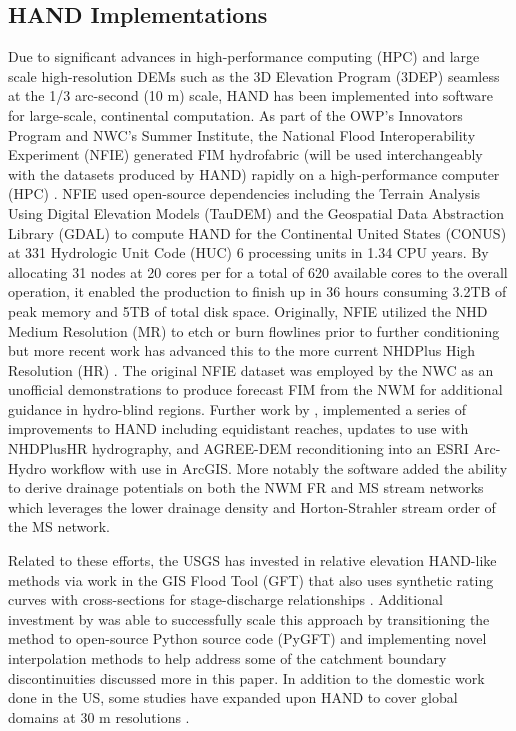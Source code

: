 \documentclass[draft]{dependencies/agujournal2019}
\begin{document}
\subsection{HAND Implementations}
%
Due to significant advances in high-performance computing (HPC) and large scale high-resolution DEMs such as the 3D Elevation Program (3DEP) seamless at the 1/3 arc-second (10 m) scale, HAND has been implemented into software for large-scale, continental computation. 
As part of the OWP's Innovators Program and NWC's Summer Institute, the National Flood Interoperability Experiment (NFIE) generated FIM hydrofabric (will be used interchangeably with the datasets produced by HAND) rapidly on a high-performance computer (HPC) \cite{maidment2017conceptual,liu2016cybergis}. 
NFIE used open-source dependencies including the Terrain Analysis Using Digital Elevation Models (TauDEM) \cite{tarboton2005terrain} and the Geospatial Data Abstraction Library (GDAL) \cite{warmerdam2008geospatial} to compute HAND for the Continental United States (CONUS) at 331 Hydrologic Unit Code (HUC) 6 processing units in 1.34 CPU years.
By allocating 31 nodes at 20 cores per for a total of 620 available cores to the overall operation, it enabled the production to finish up in 36 hours consuming 3.2TB of peak memory and 5TB of total disk space.
Originally, NFIE utilized the NHD Medium Resolution (MR) to etch or burn flowlines prior to further conditioning but more recent work has advanced this to the more current NHDPlus High Resolution (HR) \cite{liu2020height}. 
The original NFIE dataset was employed by the NWC as an unofficial demonstrations to produce forecast FIM from the NWM for additional guidance in hydro-blind regions.
Further work by , implemented a series of improvements to HAND including equidistant reaches, updates to use with NHDPlusHR hydrography, and AGREE-DEM reconditioning \cite{hellweger1997agree} into an ESRI Arc-Hydro workflow with use in ArcGIS. 
More notably the software added the ability to derive drainage potentials on both the NWM FR and MS stream networks which leverages the lower drainage density and Horton-Strahler stream order of the MS network.

Related to these efforts, the USGS has invested in relative elevation HAND-like methods via work in the GIS Flood Tool (GFT) that also uses synthetic rating curves with cross-sections for stage-discharge relationships \cite{verdin2016software}.
Additional investment by  was able to successfully scale this approach by transitioning the method to open-source Python source code (PyGFT) and implementing novel interpolation methods to help address some of the catchment boundary discontinuities discussed more in this paper.
In addition to the domestic work done in the US, some studies have expanded upon HAND to cover global domains at 30 m resolutions \cite{yamazaki2019merit,donchyts2016global}.
%
\end{document}

